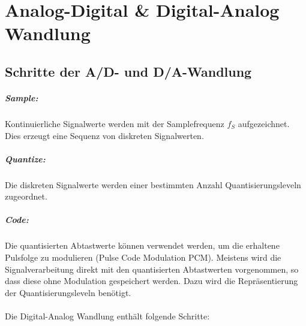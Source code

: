 



\chapter{Analog-Digital \& Digital-Analog Wandlung}
\section{Schritte der A/D- und D/A-Wandlung}
\paragraph{Sample:} Kontinuierliche Signalwerte werden mit der Samplefrequenz
$f_S$ aufgezeichnet. Dies erzeugt eine Sequenz von diskreten Signalwerten.

\paragraph{Quantize:} Die diskreten Signalwerte werden einer bestimmten
Anzahl Quantisierungsleveln zugeordnet.

\paragraph{Code:} Die quantisierten Abtastwerte können verwendet werden,
um die erhaltene Pulsfolge zu modulieren (Pulse Code Modulation PCM). Meistens
wird die Signalverarbeitung direkt mit den quantisierten Abtastwerten vorgenommen,
so dass diese ohne Modulation gespeichert werden. Dazu wird die Repräsentierung
der Quantisierungsleveln benötigt.\\
\\
Die Digital-Analog Wandlung enthält folgende Schritte:\\
